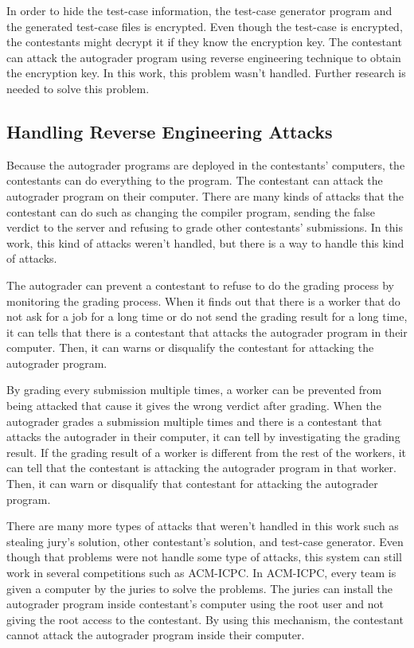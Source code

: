 \documentclass[conference,a4paper]{IEEEtran}
\begin{document}
In order to hide the test-case information, the test-case generator program and the generated test-case files is encrypted. Even though the test-case is encrypted, the contestants might decrypt it if they know the encryption key. The contestant can attack the autograder program using reverse engineering technique to obtain the encryption key. In this work, this problem wasn't handled. Further research is needed to solve this problem.

\subsection{Handling Reverse Engineering Attacks}

Because the autograder programs are deployed in the contestants' computers, the contestants can do everything to the program. The contestant can attack the autograder program on their computer. There are many kinds of attacks that the contestant can do such as changing the compiler program, sending the false verdict to the server and refusing to grade other contestants' submissions. In this work, this kind of attacks weren't handled, but there is a way to handle this kind of attacks.

The autograder can prevent a contestant to refuse to do the grading process by monitoring the grading process. When it finds out that there is a worker that do not ask for a job for a long time or do not send the grading result for a long time, it can tells that there is a contestant that attacks the autograder program in their computer. Then, it can warns or disqualify the contestant for attacking the autograder program.

By grading every submission multiple times, a worker can be prevented from being attacked that cause it gives the wrong verdict after grading. When the autograder grades a submission multiple times and there is a contestant that attacks the autograder in their computer, it can tell by investigating the grading result. If the grading result of a worker is different from the rest of the workers, it can tell that the contestant is attacking the autograder program in that worker. Then, it can warn or disqualify that contestant for attacking the autograder program.

There are many more types of attacks that weren't handled in this work such as stealing jury's solution, other contestant's solution, and test-case generator. Even though that problems were not handle some type of attacks, this system can still work in several competitions such as ACM-ICPC. In ACM-ICPC, every team is given a computer by the juries to solve the problems. The juries can install the autograder program inside contestant's computer using the root user and not giving the root access to the contestant. By using this mechanism, the contestant cannot attack the autograder program inside their computer.
\end{document}
